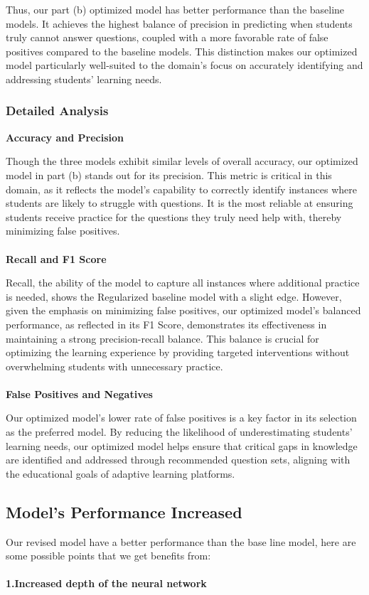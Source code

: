 \documentclass{article}
\begin{document}
Thus, our part (b) optimized model has better performance than the baseline models. It achieves the highest balance of precision in predicting when students truly cannot answer questions, coupled with a more favorable rate of false positives compared to the baseline models. This distinction makes our optimized model particularly well-suited to the domain's focus on accurately identifying and addressing students' learning needs.


\subsubsection*{Detailed Analysis}
\textbf{Accuracy and Precision}

Though the three models exhibit similar levels of overall accuracy,  our optimized model in part (b) stands out for its precision. This metric is critical in this domain, as it reflects the model's capability to correctly identify instances where students are likely to struggle with questions. It is the most reliable at ensuring students receive practice for the questions they truly need help with, thereby minimizing false positives.
\\
\\
\textbf{Recall and F1 Score}

Recall, the ability of the model to capture all instances where additional practice is needed, shows the Regularized baseline model with a slight edge. However, given the emphasis on minimizing false positives, our optimized model's balanced performance, as reflected in its F1 Score, demonstrates its effectiveness in maintaining a strong precision-recall balance. This balance is crucial for optimizing the learning experience by providing targeted interventions without overwhelming students with unnecessary practice.
\\
\\
\textbf{False Positives and Negatives}

Our optimized model's lower rate of false positives is a key factor in its selection as the preferred model. By reducing the likelihood of underestimating students' learning needs, our optimized model helps ensure that critical gaps in knowledge are identified and addressed through recommended question sets, aligning with the educational goals of adaptive learning platforms.
\subsection*{Model’s Performance Increased}
Our revised model have a better performance than the base line model, here are some possible points that we get benefits from:\\
\\
\textbf{1.Increased depth of the neural network}
\end{document}
